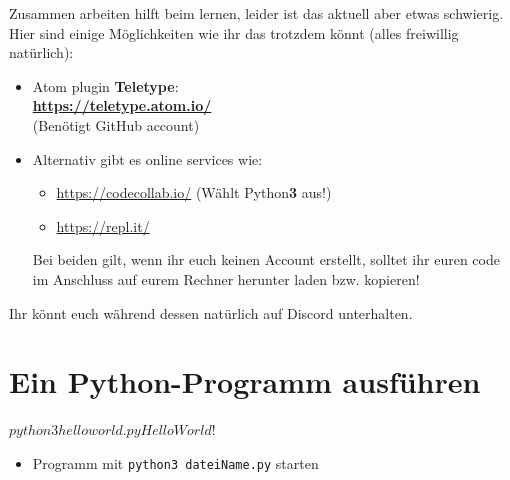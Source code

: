 \begin{frame}
	\slidehead
		Zusammen arbeiten hilft beim lernen, leider ist das aktuell aber etwas schwierig.\\
		Hier sind einige Möglichkeiten wie ihr das trotzdem könnt (alles freiwillig natürlich):
	\vspace{0.5cm}

	\begin{itemize}
		\item Atom plugin \textbf{Teletype}:\\ \href{https://teletype.atom.io/}{\textbf{https://teletype.atom.io/}}\\(Benötigt GitHub account)
		\item Alternativ gibt es online services wie:
		\begin{itemize}
			\item \href{https://codecollab.io/}{https://codecollab.io/} (Wählt Python\textbf{3} aus!)
			\item \href{https://repl.it/}{https://repl.it/}
		\end{itemize}
		Bei beiden gilt, wenn ihr euch keinen Account erstellt, solltet ihr euren code im Anschluss auf eurem Rechner herunter laden bzw. kopieren!
	\end{itemize}
	Ihr könnt euch während dessen natürlich auf Discord unterhalten.
\end{frame}

\section{Ein Python-Programm ausführen}
\begin{frame}[fragile]
	\slidehead
	\begin{bashcode}
		$ python3 helloworld.py
		Hello World!
		$
	\end{bashcode}

	\begin{itemize}
		\item Programm mit \texttt{python3 dateiName.py} starten
	\end{itemize}
\end{frame}

